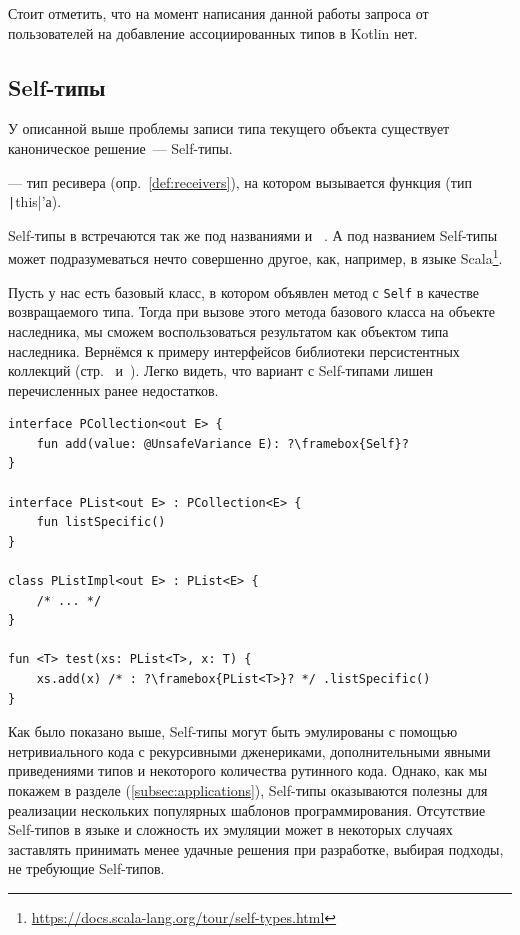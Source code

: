 Стоит отметить, что на момент написания данной работы запроса от пользователей на добавление ассоциированных типов в Kotlin нет.


\subsection{Self-типы} \label{subsec:self-types}

У описанной выше проблемы записи типа текущего объекта существует каноническое решение~--- Self-типы.

\begin{definition}
    \label{def:self-type}
     --- тип ресивера (опр.~\ref{def:receivers}), на котором вызывается функция (тип \texttt|this|'а).
\end{definition}

Self-типы в встречаются так же под названиями  и ~\cite{ryu2016thistype}.
А под названием Self-типы может подразумеваться нечто совершенно другое, как, например, в языке Scala\footnote{\url{https://docs.scala-lang.org/tour/self-types.html}}.

Пусть у нас есть базовый класс, в котором объявлен метод с \texttt{Self} в качестве возвращаемого типа.
Тогда при вызове этого метода базового класса на объекте наследника, мы сможем воспользоваться результатом как объектом типа наследника.
Вернёмся к примеру интерфейсов библиотеки персистентных коллекций (стр.~\pageref{subsubsec:recursive-generics} и~\pageref{subsubsec:abstract-override}).
Легко видеть, что вариант с Self-типами лишен перечисленных ранее недостатков.

\begin{verbatim}
interface PCollection<out E> {
    fun add(value: @UnsafeVariance E): ?\framebox{Self}?
}

interface PList<out E> : PCollection<E> {
    fun listSpecific()
}

class PListImpl<out E> : PList<E> {
    /* ... */
}

fun <T> test(xs: PList<T>, x: T) {
    xs.add(x) /* : ?\framebox{PList<T>}? */ .listSpecific()
}
\end{verbatim}

Как было показано выше, Self-типы могут быть эмулированы с помощью нетривиального кода с рекурсивными дженериками, дополнительными явными приведениями типов и некоторого количества рутинного кода.
Однако, как мы покажем в разделе (\ref{subsec:applications}), Self-типы оказываются полезны для реализации нескольких популярных шаблонов программирования.
Отсутствие Self-типов в языке и сложность их эмуляции может в некоторых случаях заставлять принимать менее удачные решения при разработке, выбирая подходы, не требующие Self-типов.

